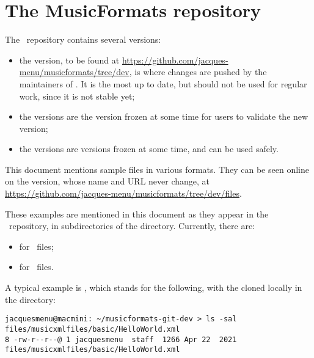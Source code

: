 
\chapter{The MusicFormats repository}

The \mf\ repository contains several versions:
\begin{itemize}
\item the  version, to be found at \url{https://github.com/jacques-menu/musicformats/tree/dev}, is where changes are pushed by the maintainers of \mf. It is the most up to date, but should not be used for regular work, since it is not stable yet;
\item the  versions are the  version frozen at some time for users to validate the new version;
\item the  versions are  versions frozen at some time, and can be used safely.
\end{itemize}

This document mentions sample files in various formats. They can be seen online on the  version, whose name and URL never change, at \url{https://github.com/jacques-menu/musicformats/tree/dev/files}.

These examples are mentioned in this document as they appear in the \mf\ repository, in subdirectories of the  directory. Currently, there are:
\begin{itemize}
\item {} for \mxml\ files;
\item {} for \msdlLang\ files.
\end{itemize}

A typical example is , which stands for the following, with the  cloned locally in the  directory:
\begin{lstlisting}[language=Terminal]
jacquesmenu@macmini: ~/musicformats-git-dev > ls -sal files/musicxmlfiles/basic/HelloWorld.xml
8 -rw-r--r--@ 1 jacquesmenu  staff  1266 Apr 22  2021 files/musicxmlfiles/basic/HelloWorld.xml
\end{lstlisting}

